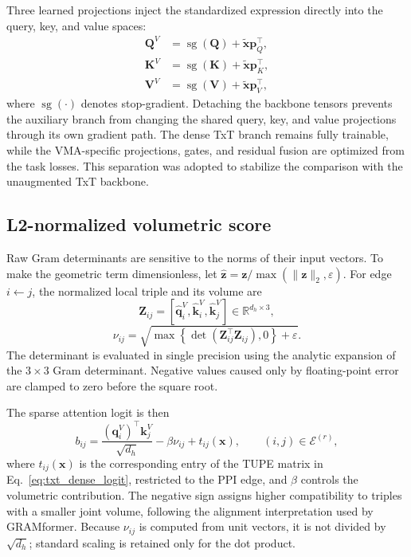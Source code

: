 Three learned projections inject the standardized expression directly into the query, key, and value spaces:
\begin{equation}
\begin{aligned}
    \mathbf{Q}^{V}&=\operatorname{sg}(\mathbf{Q})+\widetilde{\mathbf{x}}\mathbf{p}_Q^{\top},\\
    \mathbf{K}^{V}&=\operatorname{sg}(\mathbf{K})+\widetilde{\mathbf{x}}\mathbf{p}_K^{\top},\\
    \mathbf{V}^{V}&=\operatorname{sg}(\mathbf{V})+\widetilde{\mathbf{x}}\mathbf{p}_V^{\top},
\end{aligned}
\end{equation}
where \(\operatorname{sg}(\cdot)\) denotes stop-gradient. Detaching the backbone tensors prevents the auxiliary branch from changing the shared query, key, and value projections through its own gradient path. The dense TxT branch remains fully trainable, while the VMA-specific projections, gates, and residual fusion are optimized from the task losses. This separation was adopted to stabilize the comparison with the unaugmented TxT backbone.

\subsection{L2-normalized volumetric score}

Raw Gram determinants are sensitive to the norms of their input vectors. To make the geometric term dimensionless, let \(\widehat{\mathbf{z}}=\mathbf{z}/\max(\lVert\mathbf{z}\rVert_2,\varepsilon)\). For edge \(i\leftarrow j\), the normalized local triple and its volume are
\begin{equation}
    \mathbf{Z}_{ij}
    =\left[
       \widehat{\mathbf{q}}^{V}_i,
       \widehat{\mathbf{k}}^{V}_i,
       \widehat{\mathbf{k}}^{V}_j
      \right]
    \in\mathbb{R}^{d_h\times 3},
\end{equation}
\begin{equation}
\label{eq:ppi_volume}
    \nu_{ij}
    =\sqrt{
       \max\!\left\{
       \det\!\left(\mathbf{Z}_{ij}^{\top}\mathbf{Z}_{ij}\right),0
       \right\}+\varepsilon
      }.
\end{equation}
The determinant is evaluated in single precision using the analytic expansion of the \(3\times3\) Gram determinant. Negative values caused only by floating-point error are clamped to zero before the square root.

The sparse attention logit is then
\begin{equation}
\label{eq:ppi_vma_logit}
    b_{ij}
    =
    \frac{(\mathbf{q}^{V}_i)^{\top}\mathbf{k}^{V}_j}{\sqrt{d_h}}
    -\beta\nu_{ij}
    +t_{ij}(\mathbf{x}),
    \qquad (i,j)\in\mathcal{E}^{(r)},
\end{equation}
where \(t_{ij}(\mathbf{x})\) is the corresponding entry of the TUPE matrix in Eq.~\eqref{eq:txt_dense_logit}, restricted to the PPI edge, and \(\beta\) controls the volumetric contribution. The negative sign assigns higher compatibility to triples with a smaller joint volume, following the alignment interpretation used by GRAMformer. Because \(\nu_{ij}\) is computed from unit vectors, it is not divided by \(\sqrt{d_h}\); standard scaling is retained only for the dot product.

